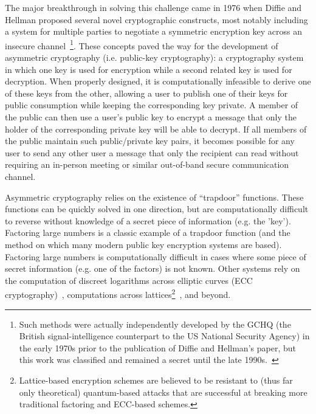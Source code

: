 The major breakthrough in solving this challenge came in 1976 when
Diffie and Hellman proposed several novel cryptographic constructs,
most notably including a system for multiple parties to negotiate a
symmetric encryption key across an insecure
channel~\cite{diffie1976}\footnote{Such methods were actually
  independently developed by the GCHQ (the British signal-intelligence
  counterpart to the US National Security Agency) in the early 1970s
  prior to the publication of Diffie and Hellman's paper, but this
  work was classified and remained a secret until the late
  1990s.~\cite{singh1999}}. These concepts paved the way for the
development of asymmetric cryptography (i.e. public-key cryptography):
a cryptography system in which one key is used for encryption while a
second related key is used for decryption. When properly designed, it
is computationally infeasible to derive one of these keys from the
other, allowing a user to publish one of their keys for public
consumption while keeping the corresponding key private. A member of
the public can then use a user's public key to encrypt a message that
only the holder of the corresponding private key will be able to
decrypt. If all members of the public maintain such public/private key
pairs, it becomes possible for any user to send any other user a
message that only the recipient can read without requiring an
in-person meeting or similar out-of-band secure communication channel.

Asymmetric cryptography relies on the existence of ``trapdoor''
functions. These functions can be quickly solved in one direction, but
are computationally difficult to reverse without knowledge of a secret
piece of information (e.g. the 'key'). Factoring large numbers is a
classic example of a trapdoor function (and the method on which many
modern public key encryption systems are based). Factoring large
numbers is computationally difficult in cases where some piece of
secret information (e.g. one of the factors) is not known. Other
systems rely on the computation of discreet logarithms across elliptic
curves (ECC cryptography)~\cite{Koblitz1987, Miller1986}, computations
across lattices\footnote{Lattice-based encryption schemes are believed
  to be resistant to (thus far only theoretical) quantum-based attacks
  that are successful at breaking more traditional factoring and
  ECC-based schemes.}~\cite{Ajtai1996}, and beyond.

